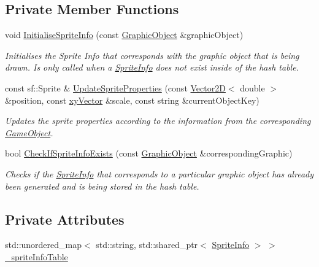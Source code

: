 \subsection*{Private Member Functions}
\begin{DoxyCompactItemize}
\item 
void \hyperlink{class_update_game_object_display_ab9405bbbabaa083cfdaefbbe84cb7cd4}{Initialise\+Sprite\+Info} (const \hyperlink{class_graphic_object}{Graphic\+Object} \&graphic\+Object)
\begin{DoxyCompactList}\small\item\em Initialises the Sprite Info that corresponds with the graphic object that is being drawn. Is only called when a \hyperlink{struct_sprite_info}{Sprite\+Info} does not exist inside of the hash table. \end{DoxyCompactList}\item 
const sf\+::\+Sprite \& \hyperlink{class_update_game_object_display_ae0419a504b647db44f909f75efdca9a3}{Update\+Sprite\+Properties} (const \hyperlink{class_vector2_d}{Vector2D}$<$ double $>$ \&position, const \hyperlink{structxy_vector}{xy\+Vector} \&scale, const string \&current\+Object\+Key)
\begin{DoxyCompactList}\small\item\em Updates the sprite properties according to the information from the corresponding \hyperlink{class_game_object}{Game\+Object}. \end{DoxyCompactList}\item 
bool \hyperlink{class_update_game_object_display_a10502ed4d422e5bab6b5f3591d392c55}{Check\+If\+Sprite\+Info\+Exists} (const \hyperlink{class_graphic_object}{Graphic\+Object} \&corresponding\+Graphic)
\begin{DoxyCompactList}\small\item\em Checks if the \hyperlink{struct_sprite_info}{Sprite\+Info} that corresponds to a particular graphic object has already been generated and is being stored in the hash table. \end{DoxyCompactList}\end{DoxyCompactItemize}
\subsection*{Private Attributes}
\begin{DoxyCompactItemize}
\item 
std\+::unordered\+\_\+map$<$ std\+::string, std\+::shared\+\_\+ptr$<$ \hyperlink{struct_sprite_info}{Sprite\+Info} $>$ $>$ \hyperlink{class_update_game_object_display_a51ae3f07958294b737885c9a0bd86153}{\+\_\+sprite\+Info\+Table}
\end{DoxyCompactItemize}


